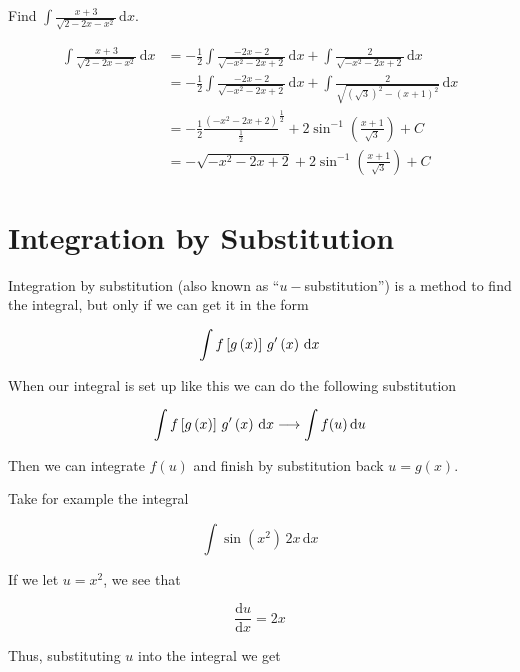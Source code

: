 \documentclass[11pt,a4paper]{book}
\begin{document}
\begin{example}

Find ${\displaystyle \int\frac{x+3}{\sqrt{2-2x-x^{2}}}\, \mathrm{d}x}$.

\medskip

\Solution

\begin{align*}
{\displaystyle \int\frac{x+3}{\sqrt{2-2x-x^{2}}}\, \mathrm{d}x} & ={\displaystyle -\frac{1}{2}\int\frac{-2x-2}{\sqrt{-x^{2}-2x+2}}\, \mathrm{d}x}+\int\frac{2}{\sqrt{-x^{2}-2x+2}}\, \mathrm{d}x\\
 & ={\displaystyle -\frac{1}{2}\int\frac{-2x-2}{\sqrt{-x^{2}-2x+2}}\, \mathrm{d}x}+\int\frac{2}{\sqrt{\left(\sqrt{3}\right)^{2}-(x+1)^{2}}}\, \mathrm{d}x\\
 & =-\frac{1}{2}\frac{\left(-x^{2}-2x+2\right)}{\frac{1}{2}}^{\frac{1}{2}}+2\sin^{-1}\left(\frac{x+1}{\sqrt{3}}\right)+C\\
 & =-\sqrt{-x^{2}-2x+2}+2\sin^{-1}\left(\frac{x+1}{\sqrt{3}}\right)+C
\end{align*}

\end{example}

\newpage{}

\section{Integration by Substitution}

Integration by substitution (also known as ``$u-$substitution'')
is a method to find the integral, but only if we can get it in the
form

\[
\int f\left[g\left(x\right)\right]\thinspace g'\left(x\right)\,\mathrm{d}x
\]

When our integral is set up like this we can do the following substitution

\[
\int f\left[g\left(x\right)\right]\thinspace g'\left(x\right)\,\mathrm{d}x\longrightarrow\int f(u)\, \mathrm{d}u
\]

Then we can integrate $f(u)$ and finish by substitution back $u=g(x)$.

Take for example the integral

\[
\int\sin\left(x^{2}\right)\,2x\, \mathrm{d}x
\]

If we let $u=x^{2}$, we see that

\[
\frac{\mathrm{d}u}{\mathrm{d}x}=2x
\]

Thus, substituting $u$ into the integral we get
\end{document}
